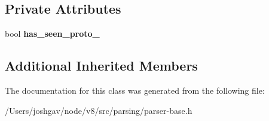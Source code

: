 \subsection*{Private Attributes}
\begin{DoxyCompactItemize}
\item 
bool {\bfseries has\+\_\+seen\+\_\+proto\+\_\+}\hypertarget{classv8_1_1internal_1_1_parser_base_1_1_object_literal_checker_a1cf6edbce927a0cdf5dbb3dcfc508226}{}\label{classv8_1_1internal_1_1_parser_base_1_1_object_literal_checker_a1cf6edbce927a0cdf5dbb3dcfc508226}

\end{DoxyCompactItemize}
\subsection*{Additional Inherited Members}


The documentation for this class was generated from the following file\+:\begin{DoxyCompactItemize}
\item 
/\+Users/joshgav/node/v8/src/parsing/parser-\/base.\+h\end{DoxyCompactItemize}
